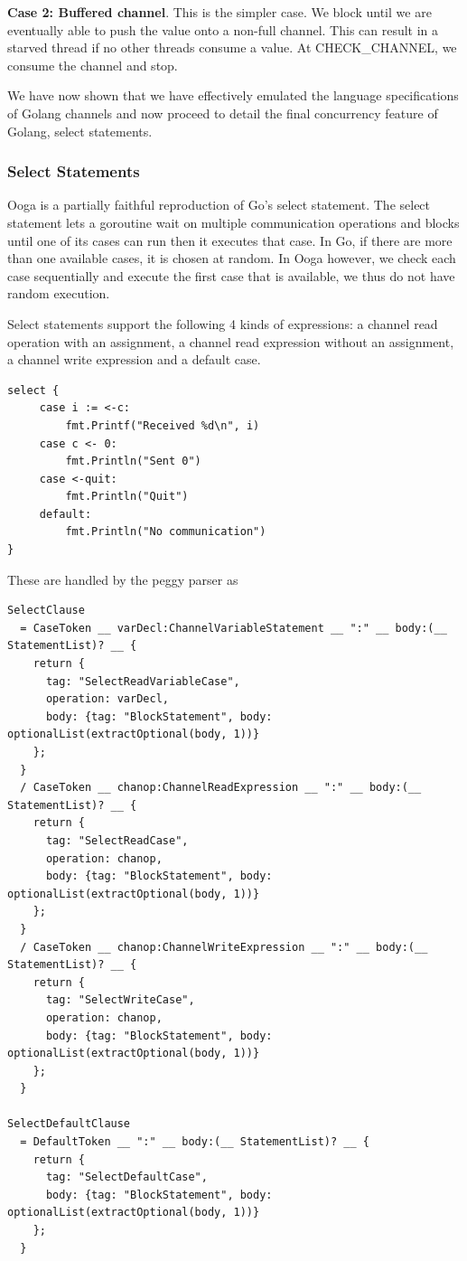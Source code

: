 \documentclass{report}
\begin{document}
\textbf{Case 2: Buffered channel}. This is the simpler case. We block until we are eventually able to push the value onto a non-full channel. This can result in a starved thread if no other threads consume a value. At CHECK\_CHANNEL, we consume the channel and stop.

We have now shown that we have effectively emulated the language specifications of Golang channels and now proceed to detail the final concurrency feature of Golang, select statements.

\subsubsection{Select Statements}

Ooga is a partially faithful reproduction of Go's select statement. The select statement lets a goroutine wait on multiple communication operations and blocks until one of its cases can run then it executes that case. In Go, if there are more than one available cases, it is chosen at random. In Ooga however, we check each case sequentially and execute the first case that is available, we thus do not have random execution.

Select statements support the following 4 kinds of expressions: a channel read operation with an assignment, a channel read expression without an assignment, a channel write expression and a default case.

\begin{verbatim}
select {
     case i := <-c:
         fmt.Printf("Received %d\n", i)
     case c <- 0:
         fmt.Println("Sent 0")
     case <-quit:
         fmt.Println("Quit")
     default:
         fmt.Println("No communication")
}
\end{verbatim}

These are handled by the peggy parser as 

\begin{verbatim}
SelectClause
  = CaseToken __ varDecl:ChannelVariableStatement __ ":" __ body:(__ StatementList)? __ {
    return {
      tag: "SelectReadVariableCase",
      operation: varDecl,
      body: {tag: "BlockStatement", body: optionalList(extractOptional(body, 1))}
    };
  }
  / CaseToken __ chanop:ChannelReadExpression __ ":" __ body:(__ StatementList)? __ {
    return {
      tag: "SelectReadCase",
      operation: chanop,
      body: {tag: "BlockStatement", body: optionalList(extractOptional(body, 1))}
    };
  }
  / CaseToken __ chanop:ChannelWriteExpression __ ":" __ body:(__ StatementList)? __ {
    return {
      tag: "SelectWriteCase",
      operation: chanop,
      body: {tag: "BlockStatement", body: optionalList(extractOptional(body, 1))}
    };
  }

SelectDefaultClause
  = DefaultToken __ ":" __ body:(__ StatementList)? __ {
    return {
      tag: "SelectDefaultCase",
      body: {tag: "BlockStatement", body: optionalList(extractOptional(body, 1))}
    };
  }
\end{verbatim}
\end{document}
